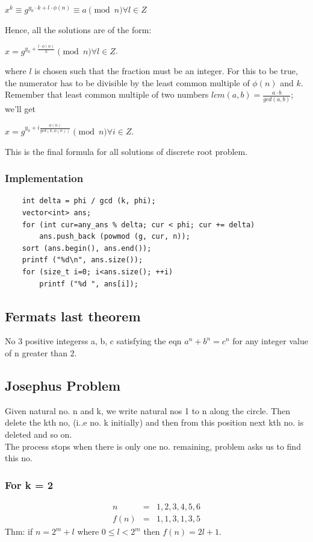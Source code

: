 \documentclass[8pt, a4paper, oneside, twocolumn]{extarticle}
\begin{document}
$x^k \equiv g^{ y_0 \cdot k + l \cdot \phi (n)} \equiv a \pmod n \forall l \in Z$

Hence, all the solutions are of the form:

$x = g^{y_0 + \frac {l \cdot \phi (n)}{k}} \pmod n \forall l \in Z$.

where $l$ is chosen such that the fraction must be an integer. For this to be true, the numerator has to be divisible by the least common multiple of $\phi (n)$ and $k$. Remember that least common multiple of two numbers $lcm(a, b) = \frac{a \cdot b}{gcd(a, b)}$; we'll get

$x = g^{y_0 + i \frac {\phi (n)}{gcd(k, \phi (n))}} \pmod n \forall i \in Z$.

This is the final formula for all solutions of discrete root problem.
\subsubsection{Implementation}
\begin{verbatim}
    int delta = phi / gcd (k, phi);
	vector<int> ans;
	for (int cur=any_ans % delta; cur < phi; cur += delta)
		ans.push_back (powmod (g, cur, n));
	sort (ans.begin(), ans.end());
	printf ("%d\n", ans.size());
	for (size_t i=0; i<ans.size(); ++i)
		printf ("%d ", ans[i]);
\end{verbatim}
\subsection{Fermats last theorem}
No 3 positive integerss a, b, c satisfying the eqn $a^n + b^n = c^n$ for any integer value of n greater than 2.
\subsection{Josephus Problem}
Given natural no. n and k, we write natural nos 1 to n along the circle. Then delete the kth no, (i..e no. k initially) and then from this position next kth no. is deleted and so on.
\\The process stops when there is only one no. remaining, problem asks us to find this no.
\subsubsection{For k = 2}
\begin{eqnarray}n & = & 1, 2, 3, 4, 5, 6\\
f(n) & = & 1, 1, 3, 1, 3, 5
\end{eqnarray}
Thm: if $n = 2^m + l$ where $0 \leq l < 2^m$ then $f(n) = 2l + 1$.
\end{document}
